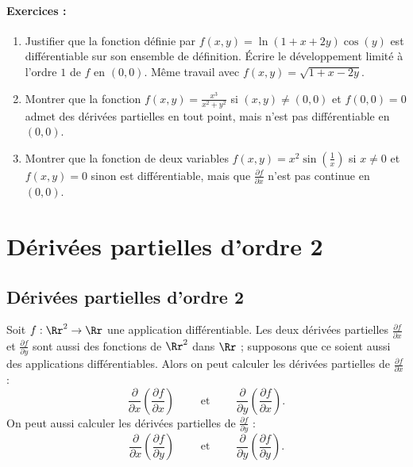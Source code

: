 
\paragraph{Exercices :}

	\begin{enumerate}
		\item Justifier que la fonction définie par 
		$f(x,y) =  \ln(1+x+2y)\cos(y)$ est différentiable sur son ensemble de définition. \'Ecrire le développement limité à l'ordre $1$ de $f$ en $(0,0)$. Même travail avec $f(x,y) = \sqrt{1+x-2y}$.
		
		\item Montrer que la fonction
		$f(x,y) = \frac{x^3}{x^2 + y^2}$ si $(x,y) \neq (0,0)$ et $f(0,0)=0$
		admet des dérivées partielles en tout point, mais n'est pas différentiable en $(0,0)$.
		
		
		\item Montrer que la fonction de deux variables
		$f(x,y) = x^2\sin \left(\frac{1}{x}\right)$ si $x \neq 0$ et $f(x,y) = 0$ sinon
		est différentiable, mais que $\frac{\partial f}{\partial x}$ n'est pas continue en $(0,0)$.
		
	\end{enumerate}




    

\section{Dérivées partielles d'ordre 2}

\subsection{Dérivées partielles d'ordre 2}

Soit $f : \Rr^2 \to \Rr$ une application différentiable.
Les deux dérivées partielles $\frac{\partial f}{\partial x}$
et $\frac{\partial f}{\partial y}$ sont aussi des fonctions de $\Rr^2$ dans $\Rr$ ; 
supposons que ce soient aussi des applications différentiables.
Alors on peut calculer les dérivées partielles de $\frac{\partial f}{\partial x}$ :
$$\frac{\partial}{\partial x}\left(\frac{\partial f}{\partial x}\right)
\qquad \text{ et } \qquad 
\frac{\partial}{\partial y}\left(\frac{\partial f}{\partial x}\right).$$
On peut aussi calculer les dérivées partielles de $\frac{\partial f}{\partial y}$ :
$$\frac{\partial}{\partial x}\left(\frac{\partial f}{\partial y}\right)
\qquad \text{ et } \qquad 
\frac{\partial}{\partial y}\left(\frac{\partial f}{\partial y}\right).$$

